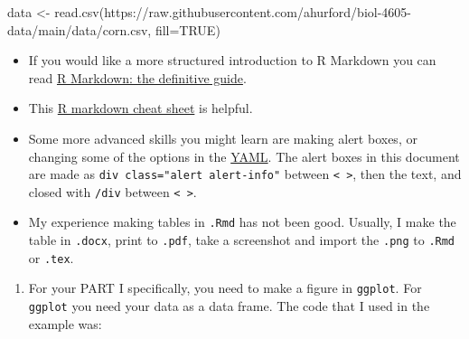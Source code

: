 \documentclass[
]{book}
\newenvironment{Shaded}{\begin{snugshade}}{\end{snugshade}}
\newcommand{\AttributeTok}[1]{\textcolor[rgb]{0.77,0.63,0.00}{#1}}
\newcommand{\ConstantTok}[1]{\textcolor[rgb]{0.00,0.00,0.00}{#1}}
\newcommand{\FunctionTok}[1]{\textcolor[rgb]{0.00,0.00,0.00}{#1}}
\newcommand{\NormalTok}[1]{#1}
\newcommand{\OtherTok}[1]{\textcolor[rgb]{0.56,0.35,0.01}{#1}}
\newcommand{\StringTok}[1]{\textcolor[rgb]{0.31,0.60,0.02}{#1}}
\providecommand{\tightlist}{%
  \setlength{\itemsep}{0pt}\setlength{\parskip}{0pt}}
\begin{document}
\begin{Shaded}
\begin{Highlighting}[]
\NormalTok{data }\OtherTok{\textless{}{-}} \FunctionTok{read.csv}\NormalTok{(}\StringTok{\textquotesingle{}https://raw.githubusercontent.com/ahurford/biol{-}4605{-}data/main/data/corn.csv\textquotesingle{}}\NormalTok{, }\AttributeTok{fill=}\ConstantTok{TRUE}\NormalTok{)}
\end{Highlighting}
\end{Shaded}

\begin{itemize}
\item
  If you would like a more structured introduction to R Markdown you can read \href{https://bookdown.org/yihui/rmarkdown/}{R Markdown: the definitive guide}.
\item
  This \href{https://www.rstudio.com/wp-content/uploads/2015/02/rmarkdown-cheatsheet.pdf}{R markdown cheat sheet} is helpful.
\item
  Some more advanced skills you might learn are making alert boxes, or changing some of the options in the \href{https://bookdown.org/yihui/rmarkdown/html-document.html}{YAML}. The alert boxes in this document are made as \texttt{div\ class="alert\ alert-info"} between \texttt{\textless{}\ \textgreater{}}, then the text, and closed with \texttt{/div} between \texttt{\textless{}\ \textgreater{}}.
\item
  My experience making tables in \texttt{.Rmd} has not been good. Usually, I make the table in \texttt{.docx}, print to \texttt{.pdf}, take a screenshot and import the \texttt{.png} to \texttt{.Rmd} or \texttt{.tex}.
\end{itemize}

\begin{enumerate}
\def\labelenumi{\arabic{enumi}.}
\setcounter{enumi}{4}
\tightlist
\item
  For your PART I specifically, you need to make a figure in \texttt{ggplot}. For \texttt{ggplot} you need your data as a data frame. The code that I used in the example was:
\end{enumerate}
\end{document}
